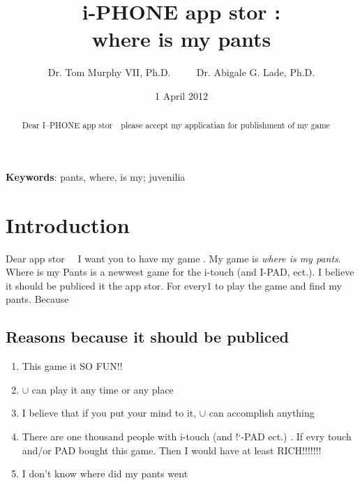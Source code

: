\documentclass[twocolumn]{article}
\begin{document}
\newcommand\comment[1]{}

\title{{\bf \huge i-PHONE app stor }:\\
       where is my pants
       }

\author{Dr. Tom Murphy VII, Ph.D. $\qquad$ Dr. Abigale G. Lade, Ph.D.}
\date{1 April 2012}

\maketitle

\begin{abstract}
Dear I--PHONE app stor\,\,\,\, please accept my applicatian for publishment of my game
\end{abstract}


\vspace{1em}
{\noindent \small {\bf Keywords}:
  pants, where, is my; juvenilia
}

\section{Introduction}

Dear {\sf app stor}$\quad$ I want you to have my game . My game is
{\it where is my pants}. Where is my Pants is a newwest game for the i-touch (and I-PAD, ect.). I believe it should be publiced it the {\sf app stor}. For every1 to play the game and find my pants. Because

\subsection{Reasons because it should be publiced}
\begin{enumerate}
\item This game it SO FUN!!
\item $\cup$ can play it any time or any place
\item I believe that if you put your mind to it, $\cup$ can accomplish anything
\item There are one thousand people with i-touch (and !`-PAD ect.) . If evry touch and/or PAD bought this game. Then I would have at least RICH!!!!!!!
\item I don't know where did my pants went
\end{enumerate}
\end{document}
